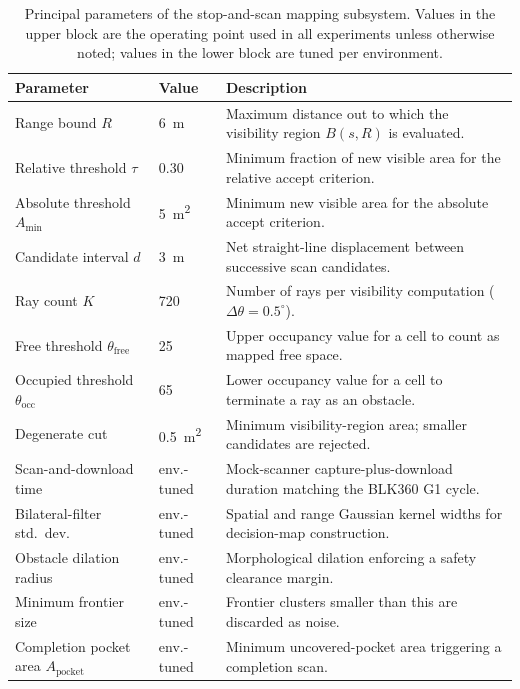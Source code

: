 \documentclass[sensors,article,submit,pdftex,moreauthors]{Definitions/mdpi}
\begin{document}
\begin{table}[H]
\caption{Principal parameters of the stop-and-scan mapping subsystem. Values in
the upper block are the operating point used in all experiments unless otherwise
noted; values in the lower block are tuned per environment.}
\label{tab:params}
\begin{tabularx}{\linewidth}{l l P}
\toprule
\textbf{Parameter} & \textbf{Value} & \textbf{Description} \\
\midrule
Range bound $R$              & 6~m   & Maximum distance out to which the visibility region $B(s,R)$ is evaluated. \\
Relative threshold $\tau$    & 0.30  & Minimum fraction of new visible area for the relative accept criterion. \\
Absolute threshold $A_{\min}$& 5~m\textsuperscript{2} & Minimum new visible area for the absolute accept criterion. \\
Candidate interval $d$       & 3~m   & Net straight-line displacement between successive scan candidates. \\
Ray count $K$                & 720   & Number of rays per visibility computation ($\Delta\theta=0.5^\circ$). \\
Free threshold $\theta_{\mathrm{free}}$ & 25 & Upper occupancy value for a cell to count as mapped free space. \\
Occupied threshold $\theta_{\mathrm{occ}}$ & 65 & Lower occupancy value for a cell to terminate a ray as an obstacle. \\
Degenerate cut               & 0.5~m\textsuperscript{2} & Minimum visibility-region area; smaller candidates are rejected. \\
\midrule
Scan-and-download time       & env.-tuned & Mock-scanner capture-plus-download duration matching the BLK360 G1 cycle. \\
Bilateral-filter std.\ dev.  & env.-tuned & Spatial and range Gaussian kernel widths for decision-map construction. \\
Obstacle dilation radius     & env.-tuned & Morphological dilation enforcing a safety clearance margin. \\
Minimum frontier size        & env.-tuned & Frontier clusters smaller than this are discarded as noise. \\
Completion pocket area $A_{\mathrm{pocket}}$ & env.-tuned & Minimum uncovered-pocket area triggering a completion scan. \\
\bottomrule
\end{tabularx}
\end{table}
\end{document}
